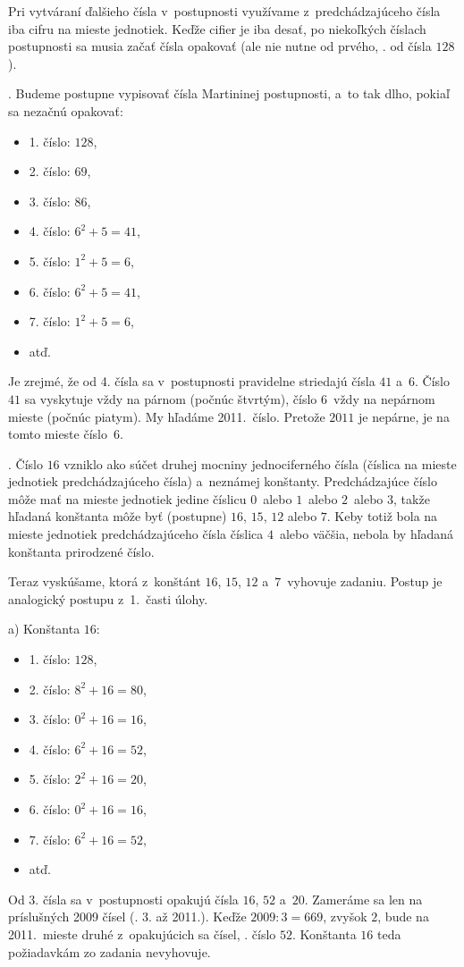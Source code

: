 {%
Pri vytváraní ďalšieho čísla v~postupnosti využívame z~predchádzajúceho čísla
iba cifru na mieste jednotiek. Keďže cifier je iba desať, po niekoľkých
číslach postupnosti sa musia začať čísla opakovať (ale nie nutne od prvého,
\tj. od čísla $128$).

.
Budeme postupne vypisovať čísla Martininej postupnosti, a~to tak dlho,
pokiaľ sa nezačnú opakovať:
\begin{itemize}
  \item 1. číslo: $128$,
  \item 2. číslo: $69$,
  \item 3. číslo: $86$,
  \item 4. číslo: $6^2+5=41$,
  \item 5. číslo: $1^2+5=6$,
  \item 6. číslo: $6^2+5=41$,
  \item 7. číslo: $1^2+5=6$,
  \item atď.
\end{itemize}
Je zrejmé, že od 4. čísla sa v~postupnosti pravidelne striedajú čísla $41$ a~$6$.
Číslo $41$ sa vyskytuje vždy na párnom (počnúc
štvrtým), číslo $6$~vždy na nepárnom mieste (počnúc piatym).
My hľadáme 2011.~číslo.
Pretože $2011$ je nepárne, je na tomto mieste číslo~$6$.

.
Číslo $16$ vzniklo ako súčet druhej mocniny jednociferného čísla (číslica na
mieste jednotiek predchádzajúceho čísla) a~neznámej konštanty.
Predchádzajúce číslo môže mať na mieste jednotiek jedine číslicu $0$~alebo $1$~alebo $2$~alebo $3$, takže hľadaná konštanta môže byť (postupne) $16$, $15$, $12$ alebo $7$.
Keby totiž bola na mieste jednotiek predchádzajúceho čísla číslica $4$~alebo väčšia,
nebola by hľadaná konštanta prirodzené číslo.

Teraz vyskúšame, ktorá z~konštánt $16$, $15$, $12$ a~$7$~vyhovuje zadaniu. Postup je
analogický postupu z~1.~časti úlohy.

a) Konštanta $16$:
\begin{itemize}
  \item 1. číslo: $128$,
  \item 2. číslo: $8^2+16=80$,
  \item 3. číslo: $0^2+16=16$,
  \item 4. číslo: $6^2+16=52$,
  \item 5. číslo: $2^2+16=20$,
  \item 6. číslo: $0^2+16=16$,
  \item 7. číslo: $6^2+16=52$,
  \item atď.
\end{itemize}
Od 3. čísla sa v~postupnosti opakujú čísla $16$, $52$ a~$20$.
Zameráme sa len na príslušných 2009 čísel (\tj. 3. až 2011.).
Keďže $2009:3=669$, zvyšok $2$, bude na 2011.~mieste druhé z~opakujúcich
sa čísel, \tj. číslo $52$.
Konštanta $16$ teda požiadavkám zo zadania nevyhovuje.

}

